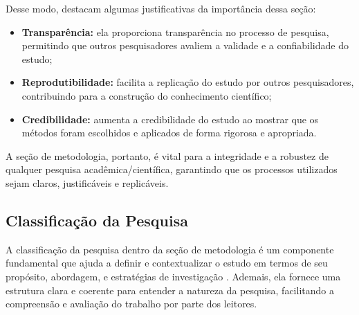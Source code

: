 Desse modo,  destacam algumas justificativas da importância dessa seção:
\begin{itemize}[itemsep=0pt, leftmargin=2.3cm]
    \item \textbf{Transparência:} ela proporciona transparência no processo de pesquisa, permitindo que outros pesquisadores avaliem a validade e a confiabilidade do estudo;
    \item \textbf{Reprodutibilidade:} facilita a replicação do estudo por outros pesquisadores, contribuindo para a construção do conhecimento científico;
    \item \textbf{Credibilidade:} aumenta a credibilidade do estudo ao mostrar que os métodos foram escolhidos e aplicados de forma rigorosa e apropriada.
\end{itemize}

A seção de metodologia, portanto, é vital para a integridade e a robustez de qualquer pesquisa acadêmica/científica, garantindo que os processos utilizados sejam claros, justificáveis e replicáveis.

\subsection{Classificação da Pesquisa}\label{sec:classif_pesquisa}

A classificação da pesquisa dentro da seção de metodologia é um componente fundamental que ajuda a definir e contextualizar o estudo em termos de seu propósito, abordagem, e estratégias de investigação \cite{Wazlawick2021,Marconi2022}. Ademais, ela fornece uma estrutura clara e coerente para entender a natureza da pesquisa, facilitando a compreensão e avaliação do trabalho por parte dos leitores.

